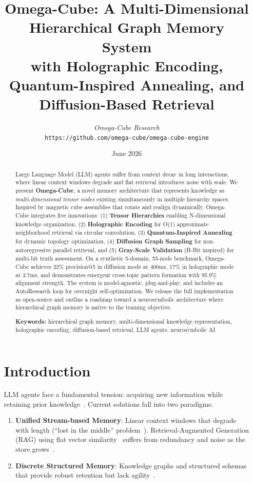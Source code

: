\documentclass[11pt,a4paper]{article}
\title{\textbf{Omega-Cube: A Multi-Dimensional Hierarchical Graph Memory System\\with Holographic Encoding, Quantum-Inspired Annealing, and Diffusion-Based Retrieval}}
\author{
    \textit{Omega-Cube Research}\\
    \texttt{https://github.com/omega-cube/omega-cube-engine}
}
\date{June 2026}
\begin{document}
\maketitle

\begin{abstract}
Large Language Model (LLM) agents suffer from context decay in long interactions, where linear context windows degrade and flat retrieval introduces noise with scale. We present \textbf{Omega-Cube}, a novel memory architecture that represents knowledge as \textit{multi-dimensional tensor nodes} existing simultaneously in multiple hierarchy spaces. Inspired by magnetic cube assemblies that rotate and realign dynamically, Omega-Cube integrates five innovations: (1) \textbf{Tensor Hierarchies} enabling N-dimensional knowledge organization, (2) \textbf{Holographic Encoding} for O(1) approximate neighborhood retrieval via circular convolution, (3) \textbf{Quantum-Inspired Annealing} for dynamic topology optimization, (4) \textbf{Diffusion Graph Sampling} for non-autoregressive parallel retrieval, and (5) \textbf{Gray-Scale Validation} (H-Bit inspired) for multi-bit truth assessment. On a synthetic 5-domain, 55-node benchmark, Omega-Cube achieves 22\% precision@5 in diffusion mode at 400ms, 17\% in holographic mode at 3.7ms, and demonstrates emergent cross-topic pattern formation with 95.9\% alignment strength. The system is model-agnostic, plug-and-play, and includes an AutoResearch loop for overnight self-optimization. We release the full implementation as open-source and outline a roadmap toward a neurosymbolic architecture where hierarchical graph memory is native to the training objective.

\textbf{Keywords:} hierarchical graph memory, multi-dimensional knowledge representation, holographic encoding, diffusion-based retrieval, LLM agents, neurosymbolic AI
\end{abstract}

\section{Introduction}

LLM agents face a fundamental tension: acquiring new information while retaining prior knowledge~\cite{wu2026gam,liu2026memverse}. Current solutions fall into two paradigms:

\begin{enumerate}[leftmargin=*,itemsep=0pt]
    \item \textbf{Unified Stream-based Memory}: Linear context windows that degrade with length (``lost in the middle'' problem~\cite{liu2024lost}). Retrieval-Augmented Generation (RAG) using flat vector similarity~\cite{lewis2020rag} suffers from redundancy and noise as the store grows~\cite{lv2026allmem}.
    \item \textbf{Discrete Structured Memory}: Knowledge graphs and structured schemas that provide robust retention but lack agility~\cite{edge2024graph,zhang2025structured}.
\end{enumerate}
\end{document}
